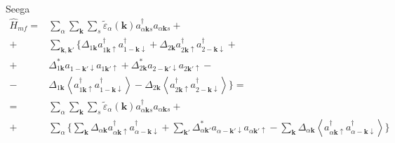 \documentclass[class=article, crop=false]{standalone}
\begin{document}
Seega 
\begin{equation}\label{key}
	\begin{split}
		\hat{H}_{mf} = & \sum_{ \alpha} \sum_{ \mathbf{k}} \sum_{s} \tilde{ \varepsilon}_{ \alpha} ( \mathbf{k}) a^{ \dagger}_{ \alpha \mathbf{k} s} a_{ \alpha \mathbf{k} s} + \\
		+ & \sum_{ \mathbf{k}, \mathbf{k}'} \lbrace \Delta_{ 1 \mathbf{k}} a^{ \dagger}_{ 1 \mathbf{k} \uparrow} a^{ \dagger}_{ 1 -\mathbf{k} \downarrow} + \Delta_{ 2 \mathbf{k}} a^{ \dagger}_{ 2 \mathbf{k} \uparrow} a^{ \dagger}_{ 2 -\mathbf{k} \downarrow} + \\
		+ &	\Delta_{ 1 \mathbf{k}}^{ \ast} a_{ 1 -\mathbf{k}' \downarrow} a_{ 1 \mathbf{k}' \uparrow} + \Delta_{ 2 \mathbf{k}}^{ \ast} a_{ 2 -\mathbf{k}' \downarrow} a_{ 2 \mathbf{k}' \uparrow} - \\
		- & \Delta_{ 1 \mathbf{k}} \left\langle a^{ \dagger}_{ 1 \mathbf{k} \uparrow} a^{ \dagger}_{ 1 -\mathbf{k} \downarrow} \right\rangle - \Delta_{ 2 \mathbf{k}} \left\langle a^{ \dagger}_{ 2 \mathbf{k} \uparrow} a^{ \dagger}_{ 2 -\mathbf{k} \downarrow} \right\rangle \rbrace = \\
		= & \sum_{ \alpha} \sum_{ \mathbf{k}} \sum_{s} \tilde{ \varepsilon}_{ \alpha} ( \mathbf{k}) a^{ \dagger}_{ \alpha \mathbf{k} s} a_{ \alpha \mathbf{k} s} + \\
		+ & \sum_{ \alpha} \lbrace \sum_{ \mathbf{k}} \Delta_{ \alpha \mathbf{k}} a^{ \dagger}_{ \alpha \mathbf{k} \uparrow} a^{ \dagger}_{ \alpha -\mathbf{k} \downarrow} + \sum_{ \mathbf{k}'} \Delta_{ \alpha \mathbf{k}'}^{ \ast} a_{ \alpha -\mathbf{k}' \downarrow} a_{ \alpha \mathbf{k}' \uparrow} - \sum_{ \mathbf{k}} \Delta_{ \alpha \mathbf{k}} \left\langle a^{ \dagger}_{ \alpha \mathbf{k} \uparrow} a^{ \dagger}_{ \alpha -\mathbf{k} \downarrow} \right\rangle \rbrace
	\end{split}
\end{equation}
\end{document}
